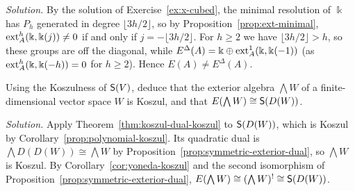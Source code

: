 \begin{hidden}
\emph{Solution.}
By the solution of Exercise~\ref{ex:x-cubed}, the minimal resolution of $\Bbbk$ has $P_h$ generated in degree $\lfloor3h/2\rfloor$, so by Proposition~\ref{prop:ext-minimal}, $\operatorname{ext}\nolimits_A^h(\Bbbk,\Bbbk(j))\neq0$ if and only if $j=-\lfloor3h/2\rfloor$.
For $h\geq2$ we have $\lfloor3h/2\rfloor>h$, so these groups are off the diagonal, while $E^\Delta(A)=\Bbbk\oplus\operatorname{ext}\nolimits^1_A(\Bbbk,\Bbbk(-1))$ (as $\operatorname{ext}\nolimits^h_A(\Bbbk,\Bbbk(-h))=0$ for $h\geq2$).
Hence $E(A)\neq E^\Delta(A)$.
\end{hidden}


\begin{exercise}
Using the Koszulness of $\mathsf{S}(V)$, deduce that the exterior algebra $\bigwedge W$ of a finite-dimensional vector space $W$ is Koszul, and that $E(\bigwedge W)\cong\mathsf{S}(D(W))$.
\end{exercise}

\begin{hidden}
\emph{Solution.}
Apply Theorem~\ref{thm:koszul-dual-koszul} to $\mathsf{S}(D(W))$, which is Koszul by Corollary~\ref{prop:polynomial-koszul}.
Its quadratic dual is $\bigwedge D(D(W))\cong\bigwedge W$ by Proposition~\ref{prop:symmetric-exterior-dual}, so $\bigwedge W$ is Koszul.
By Corollary~\ref{cor:yoneda-koszul} and the second isomorphism of Proposition~\ref{prop:symmetric-exterior-dual}, $E(\bigwedge W)\cong(\bigwedge W)^!\cong\mathsf{S}(D(W))$.
\end{hidden}

